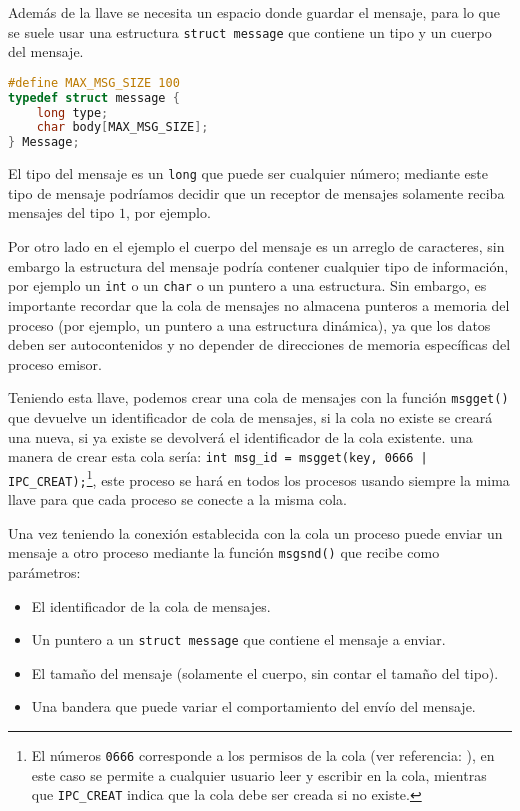 Además de la llave se necesita un espacio donde guardar el mensaje, para lo que se suele usar una estructura \texttt{struct message} que contiene un tipo y un cuerpo del mensaje.
\begin{lstlisting}[language=C, style=CodeStyle]
#define MAX_MSG_SIZE 100
typedef struct message {
    long type;
    char body[MAX_MSG_SIZE];
} Message;
\end{lstlisting}
El tipo del mensaje es un \texttt{long} que puede ser cualquier número; mediante este tipo de mensaje podríamos decidir que un receptor de mensajes solamente reciba mensajes del tipo $1$, por ejemplo.

Por otro lado en el ejemplo el cuerpo del mensaje es un arreglo de caracteres, sin embargo la estructura del mensaje podría contener cualquier tipo de información, por ejemplo un \texttt{int} o un \texttt{char} o un puntero a una estructura. Sin embargo, es importante recordar que la cola de mensajes no almacena punteros a memoria del proceso (por ejemplo, un puntero a una estructura dinámica), ya que los datos deben ser autocontenidos y no depender de direcciones de memoria específicas del proceso emisor.

Teniendo esta llave, podemos crear una cola de mensajes con la función \texttt{msgget()} que devuelve un identificador de cola de mensajes, si la cola no existe se creará una nueva, si ya existe se devolverá el identificador de la cola existente. una manera de crear esta cola sería: \texttt{int msg\_id = msgget(key, 0666 | IPC\_CREAT);}\footnote{El números \texttt{0666} corresponde a los permisos de la cola (ver referencia: ), en este caso se permite a cualquier usuario leer y escribir en la cola, mientras que \texttt{IPC\_CREAT} indica que la cola debe ser creada si no existe.}, este proceso se hará en todos los procesos usando siempre la mima llave para que cada proceso se conecte a la misma cola.

Una vez teniendo la conexión establecida con la cola un proceso puede enviar un mensaje a otro proceso mediante la función \texttt{msgsnd()} que recibe como parámetros:\begin{itemize}
    \item El identificador de la cola de mensajes.
    \item Un puntero a un \texttt{struct message} que contiene el mensaje a enviar.
    \item El tamaño del mensaje (solamente el cuerpo, sin contar el tamaño del tipo).
    \item Una bandera que puede variar el comportamiento del envío del mensaje.
\end{itemize}

